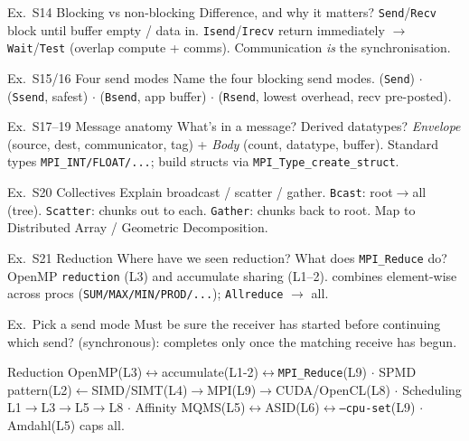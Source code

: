 \begin{example2}{Ex.\ S14 Blocking vs non-blocking}
    Difference, and why it matters?
    \tcblower
    \texttt{Send}/\texttt{Recv} block until buffer empty / data in. \texttt{Isend}/\texttt{Irecv} return immediately $\to$ \texttt{Wait}/\texttt{Test} (overlap compute + comms). Communication \emph{is} the synchronisation.
\end{example2}

\begin{example2}{Ex.\ S15/16 Four send modes}
    Name the four blocking send modes.
    \tcblower
     (\texttt{Send}) $\cdot$  (\texttt{Ssend}, safest) $\cdot$  (\texttt{Bsend}, app buffer) $\cdot$  (\texttt{Rsend}, lowest overhead, recv pre-posted).
\end{example2}

\begin{example2}{Ex.\ S17--19 Message anatomy}
    What's in a message? Derived datatypes?
    \tcblower
    \emph{Envelope} (source, dest, communicator, tag) + \emph{Body} (count, datatype, buffer). Standard types \texttt{MPI\_INT/FLOAT/...}; build structs via \texttt{MPI\_Type\_create\_struct}.
\end{example2}

\begin{example2}{Ex.\ S20 Collectives}
    Explain broadcast / scatter / gather.
    \tcblower
    \texttt{Bcast}: root$\to$all (tree). \texttt{Scatter}: chunks out to each. \texttt{Gather}: chunks back to root. Map to Distributed Array / Geometric Decomposition.
\end{example2}

\begin{example2}{Ex.\ S21 Reduction}
    Where have we seen reduction? What does \texttt{MPI\_Reduce} do?
    \tcblower
    OpenMP \texttt{reduction} (L3) and accumulate sharing (L1--2).  combines element-wise across procs (\texttt{SUM/MAX/MIN/PROD/...}); \texttt{Allreduce} $\to$ all.
\end{example2}

\begin{example2}{Ex.\ Pick a send mode}
    Must be sure the receiver has started before continuing which send?
    \tcblower
     (synchronous): completes only once the matching receive has begun.
\end{example2}

\begin{remark}
     Reduction OpenMP(L3)$\leftrightarrow$accumulate(L1-2)$\leftrightarrow$\texttt{MPI\_Reduce}(L9) $\cdot$ SPMD pattern(L2)$\leftarrow$SIMD/SIMT(L4)$\to$MPI(L9)$\to$CUDA/OpenCL(L8) $\cdot$ Scheduling L1$\to$L3$\to$L5$\to$L8 $\cdot$ Affinity MQMS(L5)$\leftrightarrow$ASID(L6)$\leftrightarrow$\texttt{--cpu-set}(L9) $\cdot$ Amdahl(L5) caps all.
\end{remark}

